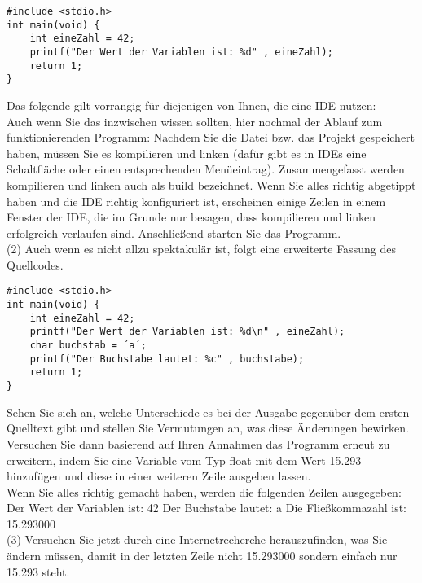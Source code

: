 \begin{verbatim}
#include <stdio.h>
int main(void) {
	int eineZahl = 42;
	printf("Der Wert der Variablen ist: %d" , eineZahl);
	return 1;
}
\end{verbatim}

Das folgende gilt vorrangig für diejenigen von Ihnen, die eine IDE nutzen:\\

Auch wenn Sie das inzwischen wissen sollten, hier nochmal der Ablauf zum funktionierenden Programm: Nachdem Sie die Datei bzw. das Projekt gespeichert haben, müssen Sie es kompilieren und linken (dafür gibt es in IDEs eine Schaltfläche oder einen entsprechenden Menüeintrag). Zusammengefasst werden kompilieren und linken auch als build bezeichnet. Wenn Sie alles richtig abgetippt haben und die IDE richtig konfiguriert ist, erscheinen einige Zeilen in einem Fenster der IDE, die im Grunde nur besagen, dass kompilieren und linken erfolgreich verlaufen sind. Anschließend starten Sie das Programm.\\

(2) Auch wenn es nicht allzu spektakulär ist, folgt eine erweiterte Fassung des Quellcodes. \\

\begin{verbatim}
#include <stdio.h>
int main(void) {
	int eineZahl = 42;
	printf("Der Wert der Variablen ist: %d\n" , eineZahl);
	char buchstab = ´a´;
	printf("Der Buchstabe lautet: %c" , buchstabe);
	return 1;
}
\end{verbatim}

Sehen Sie sich an, welche Unterschiede es bei der Ausgabe gegenüber dem ersten Quelltext gibt und stellen Sie Vermutungen an, was diese Änderungen bewirken. Versuchen Sie dann basierend auf Ihren Annahmen das Programm erneut zu erweitern, indem Sie eine Variable vom Typ float mit dem Wert 15.293 hinzufügen und diese in einer weiteren Zeile ausgeben lassen.\\

Wenn Sie alles richtig gemacht haben, werden die folgenden Zeilen ausgegeben:\\

Der Wert der Variablen ist: 42
Der Buchstabe lautet: a
Die Fließkommazahl ist: 15.293000\\

(3) Versuchen Sie jetzt durch eine Internetrecherche herauszufinden, was Sie ändern müssen, damit in der letzten Zeile nicht 15.293000 sondern einfach nur 15.293 steht.\\

